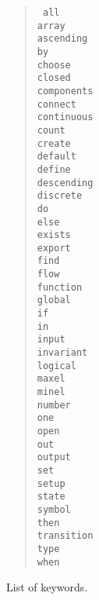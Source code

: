 \begin{itemize}
\begin{table}[htb]
\vspace{1ex}
\begin{center}
\begin{verse}
\begin{multicols}{5}
{\tt
	all\\
	array\\
	ascending\\
	by\\
	choose\\
	closed\\
	components\\
	connect\\
	continuous\\
	count\\
	create\\
	default\\
	define\\
	descending\\
	discrete\\
	do\\
	else\\
	exists\\
	export\\
	find\\
	flow\\
	function\\
	global\\
	if\\
	in\\
	input\\
	invariant\\
	logical\\
	maxel\\
	minel\\
	number\\
	one\\
	open\\
	out\\
	output\\
	set\\
	setup\\
	state\\
	symbol\\
	then\\
	transition\\
	type\\
	when\\
}
\end{multicols}
\end{verse}
\end{center}
\caption{List of \todaysname{} keywords.\label{keyword-table}}
\end{table}


\end{itemize}
